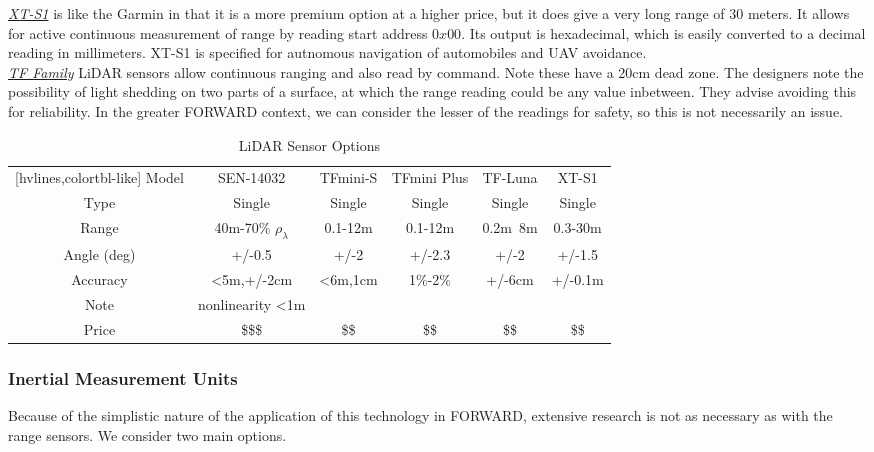 \noindent \underline{\textit{XT-S1}} is like the Garmin in that it is a more premium option at a higher price, but it does give a very long range of 30 meters. It allows for active continuous measurement of range by reading start address $0x00$. Its output is hexadecimal, which is easily converted to a decimal reading in millimeters. XT-S1 is specified for autnomous navigation of automobiles and UAV avoidance.\\

\noindent \underline{\textit{TF Family}} LiDAR sensors allow continuous ranging and also read by command. Note these have a 20cm dead zone. The designers note the possibility of light shedding on two parts of a surface, at which the range reading could be any value inbetween. They advise avoiding this for reliability. In the greater FORWARD context, we can consider the lesser of the readings for safety, so this is not necessarily an issue.\\

\begin{table}[H]
	\centering
	\setlength{\tabcolsep}{5pt} %
	\renewcommand{\arraystretch}{1.5} %
	\begin{NiceTabular}{cccccc}[hvlines,colortbl-like]
		\CodeBefore
		\Body
		Model       & SEN-14032               & TFmini-S & TFmini Plus & TF-Luna & XT-S1   \\
		Type        & Single 				  & Single   & Single      & Single  & Single  \\
		Range       & 40m-70\% $\rho_\lambda$ & 0.1-12m  & 0.1-12m     & 0.2m~8m & 0.3-30m \\
		Angle (deg) & +/-0.5                  & +/-2     & +/-2.3      & +/-2    & +/-1.5  \\
		Accuracy    & <5m,+/-2cm              & <6m,1cm  & 1\%-2\%     & +/-6cm  & +/-0.1m \\
		Note        & nonlinearity <1m        &  &  &  & \\
		Price       & \$\$\$                  & \$\$     & \$\$        & \$\$    & \$\$
	\end{NiceTabular}
	\caption{\label{fig:compareLiDAR}LiDAR Sensor Options}
\end{table}

\subsubsection{Inertial Measurement Units}
\noindent Because of the simplistic nature of the application of this technology in FORWARD, extensive research is not as necessary as with the range sensors. We consider two main options.\\

